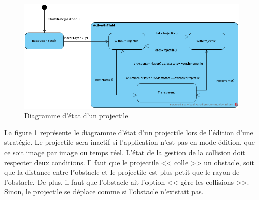 \begin{figure}[htpb]
    \centering
    \includegraphics[scale=0.32]{fig/state_diag_projectile.png}
    \caption{Diagramme d'état d'un projectile}
    \label{fig:state_diag_projectile}
\end{figure}

La figure \ref{fig:state_diag_projectile} représente le diagramme d'état d'un projectile lors de l'édition d'une stratégie.
Le projectile sera inactif si l'application n'est pas en mode édition, que ce soit image par image ou temps réel.
L'état de la gestion de la collision doit respecter deux conditions.
Il faut que le projectile << colle >> un obstacle, soit que la distance entre l'obstacle et le projectile est plus petit que le rayon de l'obstacle.
De plus, il faut que l'obstacle ait l'option << gère les collisions >>.
Sinon, le projectile se déplace comme si l'obstacle n'existait pas.

